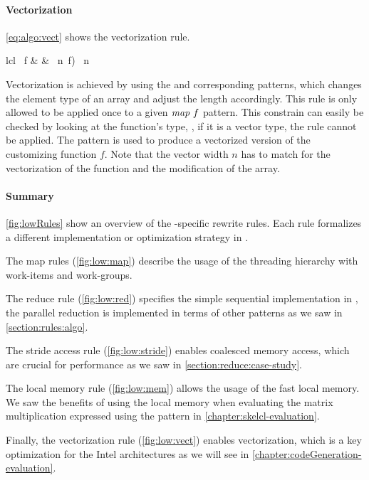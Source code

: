\paragraph{Vectorization}
\autoref{eq:algo:vect} shows the vectorization rule.
%
\begin{rerule}{lcl}
  \ f
    & \rightarrow &
        \circ {}\ n\ f)
        \circ {}\ n
  \label{eq:algo:vect}
\end{rerule}
%
Vectorization is achieved by using the  and corresponding  patterns, which changes the element type of an array and adjust the length accordingly.
This rule is only allowed to be applied once to a given $\textit{map}\ f$ pattern.
This constrain can easily be checked by looking at the function's type, \ie, if it is a vector type, the rule cannot be applied.
The \vect pattern is used to produce a vectorized version of the customizing function $f$.
Note that the vector width $n$ has to match for the vectorization of the function and the modification of the array.

\paragraph{Summary}
\autoref{fig:lowRules} show an overview of the \OpenCL-specific rewrite rules.
Each rule formalizes a different implementation or optimization strategy in \OpenCL.

The map rules (\autoref{fig:low:map}) describe the usage of the \OpenCL threading hierarchy with work-items and work-groups.

The reduce rule (\autoref{fig:low:red}) specifies the simple sequential implementation in \OpenCL, the parallel reduction is implemented in terms of other patterns as we saw in \autoref{section:rules:algo}.

The stride access rule (\autoref{fig:low:stride}) enables coalesced memory access, which are crucial for performance as we saw in \autoref{section:reduce:case-study}.

The local memory rule (\autoref{fig:low:mem}) allows the usage of the fast local memory.
We saw the benefits of using the local memory when evaluating the matrix multiplication expressed using the \allpairs pattern in \autoref{chapter:skelcl-evaluation}.

Finally, the vectorization rule (\autoref{fig:low:vect}) enables vectorization, which is a key optimization for the Intel \CPU architectures as we will see in \autoref{chapter:codeGeneration-evaluation}.

